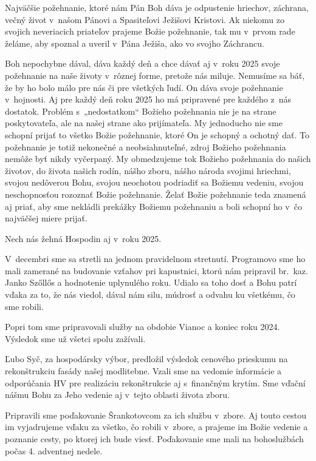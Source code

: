 Najväčšie požehnanie, ktoré nám Pán Boh dáva je odpustenie hriechov, záchrana, večný život v~našom Pánovi a Spasiteľovi Ježišovi Kristovi. Ak niekomu zo svojich neveriacich priateľov prajeme Božie požehnanie, tak mu v~prvom rade želáme, aby spoznal a uveril v~Pána Ježiša, ako vo svojho Záchrancu.

Boh nepochybne dával, dáva každý deň a chce dávať aj v~roku 2025 svoje požehnanie na naše životy v~rôznej forme, pretože nás miluje. Nemusíme sa báť, že by ho bolo málo pre nás či pre všetkých ľudí. On dáva svoje požehnanie v~hojnosti. Aj pre každý deň roku 2025 ho má pripravené pre každého z~nás dostatok. Problém s~„nedostatkom“ Božieho požehnania nie je na strane poskytovateľa, ale na našej strane ako prijímateľa. My jednoducho nie sme schopní prijať to všetko Božie požehnanie, ktoré On je schopný a ochotný dať. To požehnanie je totiž nekonečné a neobsiahnuteľné, zdroj Božieho požehnania nemôže byť nikdy vyčerpaný. My obmedzujeme tok Božieho požehnania do našich životov, do života našich rodín, nášho zboru, nášho národa svojimi hriechmi, svojou nedôverou Bohu, svojou neochotou podriadiť sa Božiemu vedeniu, svojou neschopnosťou rozoznať Božie požehnanie. Želať Božie požehnanie teda znamená aj priať, aby sme nekládli prekážky Božiemu požehnaniu a boli schopní ho v~čo najväčšej miere prijať.

Nech nás žehná Hospodin aj v~roku 2025.




V~decembri sme sa stretli na jednom pravidelnom stretnutí. Programovo sme ho mali zamerané na budovanie vzťahov pri kapustnici, ktorú nám pripravil br.~kaz. Janko Szőllős a hodnotenie uplynulého roku. Udialo sa toho dosť a Bohu patrí vďaka za to, že nás viedol, dával nám silu, múdrosť a odvahu ku všetkému, čo sme robili.

Popri tom sme pripravovali služby na obdobie Vianoc a koniec roku 2024. Výsledok sme už všetci spolu zažívali.

Ľubo Syč, za hospodársky výbor, predložil výsledok cenového prieskumu na rekonštrukciu fasády našej modlitebne. Vzali sme na vedomie informácie a odporúčania HV pre realizáciu rekonštrukcie aj s~finančným krytím. Sme vďační nášmu Bohu za Jeho vedenie aj v~tejto oblasti života zboru.

Pripravili sme poďakovanie Šrankotovcom za ich službu v~zbore. Aj touto cestou im vyjadrujeme vďaku za všetko, čo robili v~zbore, a prajeme im Božie vedenie a poznanie cesty, po ktorej ich bude viesť. Poďakovanie sme mali na bohoslužbách počas 4. adventnej nedele.


